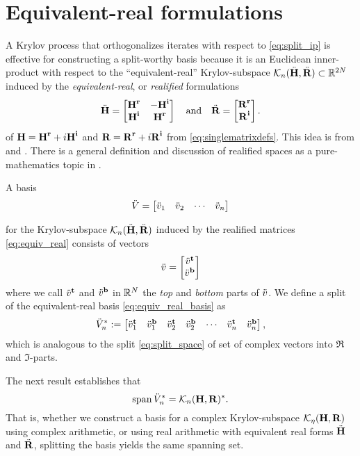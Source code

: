    
\section{Equivalent-real formulations} \label{sec:eqreal_discussion}
A Krylov process that orthogonalizes iterates with respect to \eqref{eq:split_ip} is effective for constructing a split-worthy basis because it is an Euclidean inner-product with respect to the ``equivalent-real'' Krylov-subspace $\mathcal{K}_{n}({{\ddot{\textbf{\textup{H}}}}},{{\ddot{\textbf{\textup{R}}}}})\subset\mathbb{R}^{2N}$ induced by  the
\emph{equivalent-real}, or \emph{realified} formulations 
 \begin{equation}
 {\ddot{\textbf{\textup{H}}}} = \begin{bmatrix} \textbf{\textup{H}}^{\mathrm{\bf{r}}}_{} & -\textbf{\textup{H}}^{\mathrm{\bf{i}}}_{}\\ \textbf{\textup{H}}^{\mathrm{\bf{i}}}_{} & \textbf{\textup{H}}^{\mathrm{\bf{r}}}_{} \end{bmatrix}
 \quad\text{and}\quad {\ddot{\textbf{\textup{R}}}} = \begin{bmatrix} \textbf{\textup{R}}^{\mathrm{\bf{r}}}_{}\\\textbf{\textup{R}}^{\mathrm{\bf{i}}}_{}\end{bmatrix}.
 \label{eq:equiv_real}
 \end{equation}
of $\textbf{\textup{H}}=\textbf{\textup{H}}^{\mathrm{\bf{r}}}_{} + i\textbf{\textup{H}}^{\mathrm{\bf{i}}}_{}$ and $\textbf{\textup{R}}=\textbf{\textup{R}}^{\mathrm{\bf{r}}}_{}+i\textbf{\textup{R}}^{\mathrm{\bf{i}}}_{}$  from \eqref{eq:singlematrixdefs}.
This idea is from \cite[Sec. 5]{complex_strategies} and \cite[`$K1$-formulation']{day_heroux}. There is a general definition and discussion of realified spaces as a pure-mathematics topic in \cite{palmer2001banach}. 

 A basis
 \begin{equation}
 \ddot{V} = \begin{bmatrix} \ddot{v}_1&\ddot{v}_2&\cdots&\ddot{v}_n\end{bmatrix}
 \label{eq:equiv_real_basis}
 \end{equation}

 for  the Krylov-subspace  $\mathcal{K}_{n}({{\ddot{\textbf{\textup{H}}}}},{{\ddot{\textbf{\textup{R}}}}})$ induced by the realified matrices \eqref{eq:equiv_real} consists of  vectors
\[  
\ddot{v} = \begin{bmatrix}  \ddot{v}^{\mathrm{\bf{t}}}_{} \\ \ddot{v}^{\mathrm{\bf{b}}}_{} \end{bmatrix}
\]
where we call $\ddot{v}^{\mathrm{\bf{t}}}_{}$ and $\ddot{v}^{\mathrm{\bf{b}}}_{}$ in $\mathbb{R}^N$ the \emph{top} and \emph{bottom} parts of $\ddot{v}$.
 We define a split of the equivalent-real basis \eqref{eq:equiv_real_basis} as
 \begin{equation}
 \ddot{V}_n^* : = \begin{bmatrix} \ddot{v}^{\mathrm{\bf{t}}}_{1} & \ddot{v}^{\mathrm{\bf{b}}}_{1} & \ddot{v}^{\mathrm{\bf{t}}}_{2} & \ddot{v}^{\mathrm{\bf{b}}}_{2}
	 & \cdots & \ddot{v}^{\mathrm{\bf{t}}}_{n} & \ddot{v}^{\mathrm{\bf{b}}}_{n} \end{bmatrix},
 \label{eq:split2}
 \end{equation}
which is analogous to the split \eqref{eq:split_space} of set of complex vectors into $\Re$ and $\Im$-parts. 

The next result establishes that  
\[
\operatorname*{span}{\ddot{V}_n^*} = \mathcal{K}_{n}({\textbf{\textup{H}}},{\textbf{\textup{R}}})^*.
\]
That is, whether we construct a basis for a complex Krylov-subspace  $\mathcal{K}_{\eta}({\textbf{\textup{H}}},{\textbf{\textup{R}}})$ using complex arithmetic, or using real arithmetic with equivalent real forms ${\ddot{\textbf{\textup{H}}}}$ and ${\ddot{\textbf{\textup{R}}}}$, splitting the basis yields the same spanning set.  

